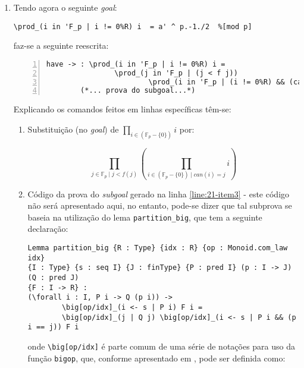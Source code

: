 \begin{enumerate}[label=\textbf{\roman*.}]
        \item Tendo agora o seguinte \textit{goal}:
                \begin{lstlisting}[language=coq,frame=single,tabsize=1]
\prod_(i in 'F_p | i != 0%R) i  = a' ^ p.-1./2  %[mod p]
                \end{lstlisting}
        faz-se a seguinte reescrita:
                \begin{lstlisting}[language=coq,frame=single, numbers=left,stepnumber=1,tabsize=1,escapechar=@, name=proof]
have -> : \prod_(i in 'F_p | i != 0%R) i =                      @ \label{line:21-item3} @
                \prod_(j in 'F_p | (j < f j))
                        \prod_(i in 'F_p | (i != 0%R) && (can i == j)) i.
        (*... prova do subgoal...*)                             @ \label{line:24-item3} @
                \end{lstlisting}
        
        Explicando os comandos feitos em linhas específicas têm-se:
        \begin{enumerate}[listparindent=\parindent]

                \item[\textbf{(\ref{line:21-item3})}] Substituição (no \textit{goal}) de $\prod_{i \in (\mathbb{F}_p - \{0\})} i$ por:
                
                        \begin{equation*}
                        \prod_{j \in \mathbb{F}_p \mid j < f(j)} \left( \prod_{i \in (\mathbb{F}_p - \{0\}) \mid can(i)= j} i \right)
                        \end{equation*}

                \item[\textbf{(\ref{line:24-item3})}] Código da prova do \textit{subgoal} gerado na linha \ref{line:21-item3} - este código não será apresentado aqui, no entanto, pode-se dizer que tal subprova se baseia na utilização do lema \lstinline[language=coq]|partition_big|, que tem a seguinte declaração:
                
                        \begin{lstlisting}[language=coq,frame=single,tabsize=1]
Lemma partition_big {R : Type} {idx : R} {op : Monoid.com_law idx} 
{I : Type} {s : seq I} {J : finType} {P : pred I} (p : I -> J) (Q : pred J) 
{F : I -> R} :
(\forall i : I, P i -> Q (p i)) ->
        \big[op/idx]_(i <- s | P i) F i =
        \big[op/idx]_(j | Q j) \big[op/idx]_(i <- s | P i && (p i == j)) F i
                        \end{lstlisting}
                onde \lstinline[language=coq]|\big[op/idx]| é parte comum de uma série de notações para uso da função \lstinline[language=coq]|bigop|, que, conforme apresentado em \cite{assia_mahboubi_2022_7118596}, pode ser definida como:


\end{enumerate}
\end{enumerate}
